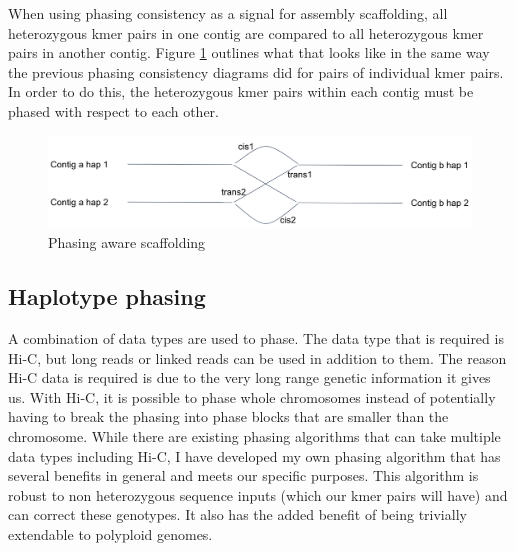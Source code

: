 \par{
When using phasing consistency as a signal for assembly scaffolding, all heterozygous kmer pairs in one contig are compared to all heterozygous kmer pairs in another contig. Figure \ref{figure:scaff} outlines what that looks like in the same way the previous phasing consistency diagrams did for pairs of individual kmer pairs. In order to do this, the heterozygous kmer pairs within each contig must be phased with respect to each other.
}

\begin{figure}[htbp!]
\caption{Phasing aware scaffolding}
\label{figure:scaff}
\begin{centering}
\includegraphics[width=\textwidth]{phasescaff.png}
\end{centering}

\end{figure}


\subsection{Haplotype phasing}

\par{
A combination of data types are used to phase. The data type that is required is Hi-C, but long reads or linked reads can be used in addition to them. The reason Hi-C data is required is due to the very long range genetic information it gives us. With Hi-C, it is possible to phase whole chromosomes instead of potentially having to break the phasing into phase blocks that are smaller than the chromosome. While there are existing phasing algorithms that can take multiple data types including Hi-C\cite{hapcut2}\cite{HICphasing}, I have developed my own phasing algorithm that has several benefits in general and meets our specific purposes. This algorithm is robust to non heterozygous sequence inputs (which our kmer pairs will have) and can correct these genotypes. It also has the added benefit of being trivially extendable to polyploid genomes.
}

